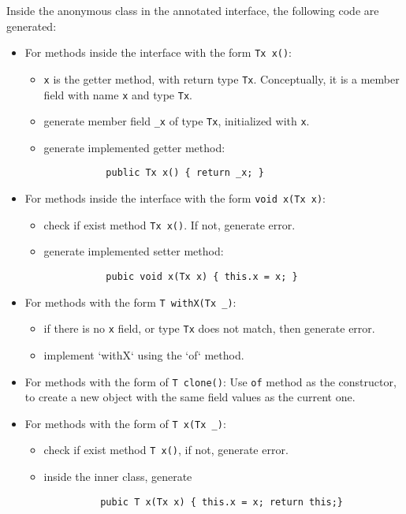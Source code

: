 \documentclass[preprint]{llncs}
\begin{document}
Inside the anonymous class in the annotated interface, the following code are
generated:
\begin{itemize}
\item For methods inside the interface with the form \texttt{Tx x()}:
  \begin{itemize}
   \item \texttt{x} is the getter method, with return type
     \texttt{Tx}. Conceptually, it is a member field with name \texttt{x} and
     type \texttt{Tx}.
   \item generate member field \texttt{\_x} of type \texttt{Tx}, initialized
     with \texttt{x}.
   \item generate implemented getter method:
       \begin{lstlisting}
           public Tx x() { return _x; }
       \end{lstlisting}
   \end{itemize}

\item For methods inside the interface with the form \texttt{void x(Tx x)}:
  \begin{itemize}
    \item check if exist method \texttt{Tx x()}. If not, generate error.
    \item generate implemented setter method:
       \begin{lstlisting}
           pubic void x(Tx x) { this.x = x; }
       \end{lstlisting}
    \end{itemize}

\item For methods with the form \texttt{T withX(Tx \_)}:
  \begin{itemize}
  \item if there is no \texttt{x} field, or type \texttt{Tx} does not match,
    then generate error.
  \item implement `withX` using the `of` method.
  \end{itemize}

\item For methods with the form of \texttt{T clone()}: Use \texttt{of} method as
  the constructor, to create a new object with the same field values as the
  current one.

\item For methods with the form of \texttt{T x(Tx \_)}:
  \begin{itemize}
    \item check if exist method \texttt{T x()}, if not, generate error.
    \item inside the inner class, generate
      \begin{lstlisting}
          pubic T x(Tx x) { this.x = x; return this;}
      \end{lstlisting}
  \end{itemize}
\end{itemize}
\end{document}
